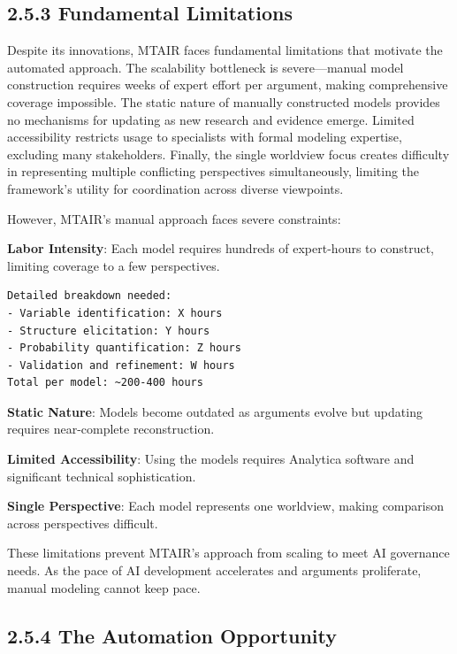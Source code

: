 \documentclass[
  11pt,
  letterpaper,
]{book}
\begin{document}
\subsection*{2.5.3 Fundamental Limitations}\label{sec-mtair-limitations}

Despite its innovations, MTAIR faces fundamental limitations that
motivate the automated approach. The scalability bottleneck is
severe---manual model construction requires weeks of expert effort per
argument, making comprehensive coverage impossible. The static nature of
manually constructed models provides no mechanisms for updating as new
research and evidence emerge. Limited accessibility restricts usage to
specialists with formal modeling expertise, excluding many stakeholders.
Finally, the single worldview focus creates difficulty in representing
multiple conflicting perspectives simultaneously, limiting the
framework's utility for coordination across diverse viewpoints.

However, MTAIR's manual approach faces severe constraints:

\textbf{Labor Intensity}: Each model requires hundreds of expert-hours
to construct, limiting coverage to a few perspectives.

\begin{verbatim}
Detailed breakdown needed:
- Variable identification: X hours
- Structure elicitation: Y hours  
- Probability quantification: Z hours
- Validation and refinement: W hours
Total per model: ~200-400 hours
\end{verbatim}

\textbf{Static Nature}: Models become outdated as arguments evolve but
updating requires near-complete reconstruction.

\textbf{Limited Accessibility}: Using the models requires Analytica
software and significant technical sophistication.

\textbf{Single Perspective}: Each model represents one worldview, making
comparison across perspectives difficult.

These limitations prevent MTAIR's approach from scaling to meet AI
governance needs. As the pace of AI development accelerates and
arguments proliferate, manual modeling cannot keep pace.

\subsection*{2.5.4 The Automation
Opportunity}\label{sec-automation-opportunity}
\end{document}
